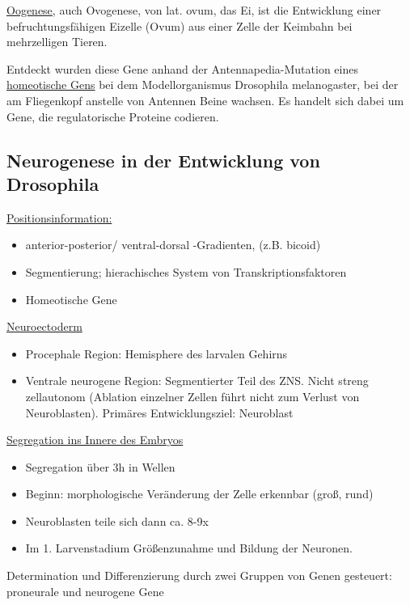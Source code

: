 \underline{Oogenese}, auch Ovogenese, von lat. ovum, das Ei, ist die Entwicklung einer befruchtungsfähigen Eizelle (Ovum) aus einer Zelle der Keimbahn bei mehrzelligen Tieren.

Entdeckt wurden diese Gene anhand der Antennapedia-Mutation eines \underline{homeotische Gens} bei dem Modellorganismus Drosophila melanogaster, bei der am Fliegenkopf anstelle von Antennen Beine wachsen. Es handelt sich dabei um Gene, die regulatorische Proteine codieren.

\subsection{Neurogenese in der Entwicklung von Drosophila}
\underline{Positionsinformation:}
\begin{itemize}
	\item anterior-posterior/ ventral-dorsal -Gradienten, (z.B. bicoid)
	\item Segmentierung; hierachisches System von Transkriptionsfaktoren
	\item Homeotische Gene
\end{itemize}

\underline{Neuroectoderm}
\begin{itemize}
	\item Procephale Region: Hemisphere des larvalen Gehirns
	\item Ventrale neurogene Region: Segmentierter Teil des ZNS. Nicht streng zellautonom (Ablation einzelner Zellen führt nicht zum Verlust von Neuroblasten). Primäres Entwicklungsziel: Neuroblast
\end{itemize}

\underline{Segregation ins Innere des Embryos}
\begin{itemize}
	\item Segregation über 3h in Wellen
	\item Beginn: morphologische Veränderung der Zelle erkennbar (groß, rund)
	\item Neuroblasten teile sich dann ca. 8-9x
	\item Im 1. Larvenstadium Größenzunahme und Bildung der Neuronen.
\end{itemize}

Determination und Differenzierung durch zwei Gruppen von Genen gesteuert: proneurale und neurogene Gene\\


